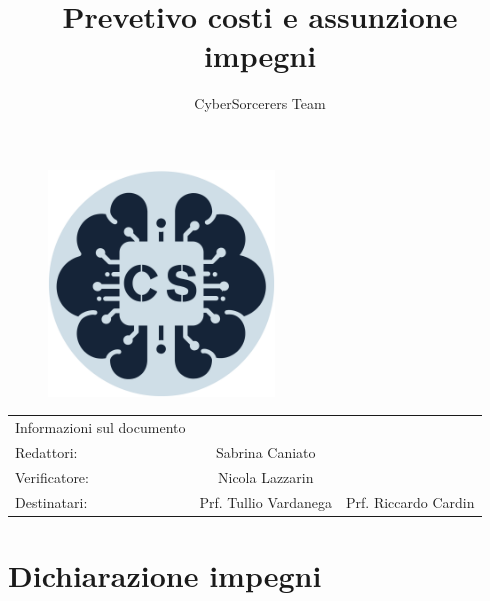 \documentclass{article}
\title{\Huge{\textbf{Prevetivo costi e assunzione impegni}}\vspace{-1em}}
\author{CyberSorcerers Team}
\date{}
\begin{document}
\maketitle

\vspace{-3em}
\begin{figure}[h]
  \centering
  \includegraphics[width=6cm, height=6cm]{documenti/logo rotondo.png}
  \label{fig:immagine}
\end{figure}

\vspace{6em}
\large{

\begin{center}
    \begin{tabular}{l c c}
        \rowcolor{Blue} 
        Informazioni sul documento & &\\ [1 ex]
        \rowcolor{LighterBlue}
        Redattori: & Sabrina Caniato & \\ [1 ex]
        \rowcolor{LightBlue}
        Verificatore: &  Nicola Lazzarin & \\ [1 ex]
        \rowcolor{LighterBlue}
        Destinatari: & Prf. Tullio Vardanega & Prf. Riccardo Cardin\\ [1 ex]


    \end{tabular}
\end{center}}
\newpage

\section{Dichiarazione impegni}
\end{document}
